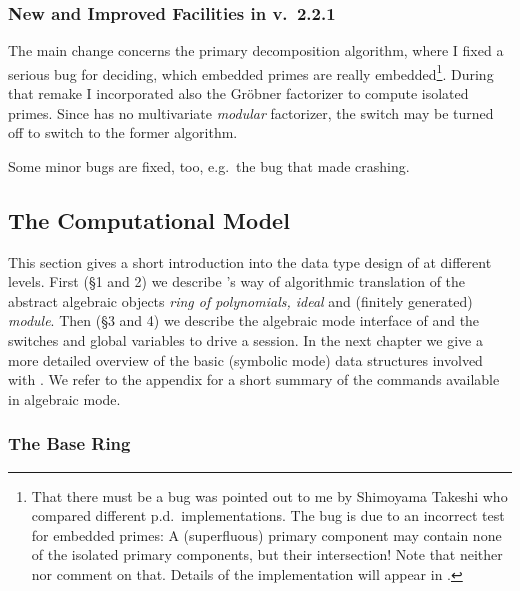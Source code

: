 \subsubsection{New and Improved Facilities in v.~2.2.1\label{221}}

The main change concerns the primary decomposition algorithm, where I
fixed a serious bug for deciding, which embedded primes are really
embedded\footnote{That there must be a bug was pointed out to me by
Shimoyama Takeshi who compared different p.d.\ implementations. The
bug is due to an incorrect test for embedded primes: A (superfluous)
primary component may contain none of the isolated primary components,
but their intersection! Note that neither \cite{Gianni:88} nor \cite{Becker:93}
comment on that. Details of the implementation will appear in
\cite{Graebe:97}.}. During that remake I incorporated also the Gr\"obner
factorizer to compute isolated primes. Since \REDUCE has no
multivariate \emph{modular} factorizer, the switch 
may be turned off to switch to the former algorithm.



Some minor bugs are fixed, too, e.g.\ the bug that made 
crashing.




\subsection{The Computational Model}

This section gives a short introduction into the data type design of
 at different levels. First (\S 1 and 2) we describe 's way
of algorithmic translation of the abstract algebraic objects
\emph{ring of polynomials, ideal} and (finitely generated) \emph{module}.
Then (\S 3 and 4) we describe the algebraic mode interface of 
and the switches and global variables to drive a session. In the next
chapter we give a more detailed overview of the basic (symbolic mode) data
structures involved with . We refer to the appendix for a short
summary of the commands available in algebraic mode.

\subsubsection{The Base Ring}

